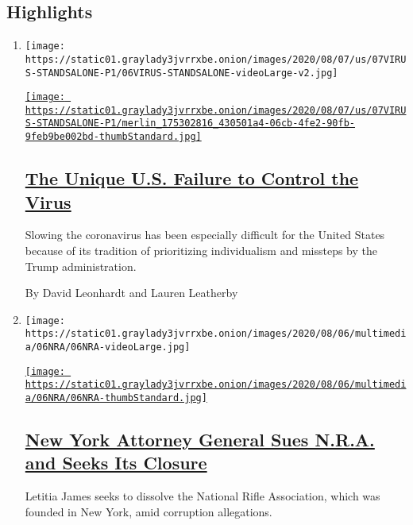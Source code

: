 \hypertarget{highlights}{%
\subsection{Highlights}\label{highlights}}

\begin{enumerate}
\def\labelenumi{\arabic{enumi}.}
\item
  \texttt{[image: https://static01.graylady3jvrrxbe.onion/images/2020/08/07/us/07VIRUS-STANDSALONE-P1/06VIRUS-STANDSALONE-videoLarge-v2.jpg]}

  \href{/2020/08/06/us/coronavirus-us.html}{\texttt{[image: https://static01.graylady3jvrrxbe.onion/images/2020/08/07/us/07VIRUS-STANDSALONE-P1/merlin\_175302816\_430501a4-06cb-4fe2-90fb-9feb9be002bd-thumbStandard.jpg]}}

  \hypertarget{the-unique-us-failure-to-control-the-virus}{%
  \subsection{\texorpdfstring{\href{/2020/08/06/us/coronavirus-us.html}{The
  Unique U.S. Failure to Control the
  Virus}}{The Unique U.S. Failure to Control the Virus}}\label{the-unique-us-failure-to-control-the-virus}}

  Slowing the coronavirus has been especially difficult for the United
  States because of its tradition of prioritizing individualism and
  missteps by the Trump administration.

  By David Leonhardt and Lauren Leatherby
\item
  \texttt{[image: https://static01.graylady3jvrrxbe.onion/images/2020/08/06/multimedia/06NRA/06NRA-videoLarge.jpg]}

  \href{/2020/08/06/us/ny-nra-lawsuit-letitia-james.html}{\texttt{[image: https://static01.graylady3jvrrxbe.onion/images/2020/08/06/multimedia/06NRA/06NRA-thumbStandard.jpg]}}

  \hypertarget{new-york-attorney-general-sues-nra-and-seeks-its-closure}{%
  \subsection{\texorpdfstring{\href{/2020/08/06/us/ny-nra-lawsuit-letitia-james.html}{New
  York Attorney General Sues N.R.A. and Seeks Its
  Closure}}{New York Attorney General Sues N.R.A. and Seeks Its Closure}}\label{new-york-attorney-general-sues-nra-and-seeks-its-closure}}

  Letitia James seeks to dissolve the National Rifle Association, which
  was founded in New York, amid corruption allegations.


\end{enumerate}
